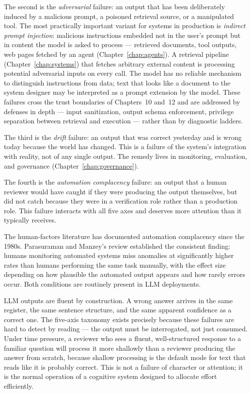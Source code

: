 The second is the \emph{adversarial} failure: an output that has
been deliberately induced by a malicious prompt, a poisoned
retrieval source, or a manipulated tool. The most practically
important variant for systems in production is \emph{indirect
prompt injection}: malicious instructions embedded not in the
user's prompt but in content the model is asked to process ---
retrieved documents, tool outputs, web pages fetched by an agent
(Chapter~\ref{chap:agents}). A retrieval pipeline (Chapter~\ref{chap:systems}) that fetches
arbitrary external content is processing potential adversarial
inputs on every call. The model has no reliable mechanism to
distinguish instructions from data; text that looks like a
document to the system designer may be interpreted as a prompt
extension by the model. These failures cross the trust boundaries
of Chapters~10 and~12 and are addressed by defenses in depth ---
input sanitization, output schema enforcement, privilege
separation between retrieval and execution --- rather than by
diagnostic ladders.

The third is the \emph{drift} failure: an output that was correct
yesterday and is wrong today because the world has changed. This
is a failure of the system's integration with reality, not of any
single output. The remedy lives in monitoring, evaluation, and
governance (Chapter~\ref{chap:governance}).

The fourth is the \emph{automation complacency} failure: an output
that a human reviewer would have caught if they were producing the
output themselves, but did not catch because they were in a
verification role rather than a production role. This failure
interacts with all five axes and deserves more attention than it
typically receives.

The human-factors literature has documented automation complacency
since the 1980s. Parasuraman and Manzey's review
\citep{parasuraman2010complacency} established the consistent
finding: humans monitoring automated systems miss anomalies at
significantly higher rates than humans performing the same task
manually, with the effect size depending on how plausible the
automated output appears and how rarely errors occur. Both
conditions are routinely present in LLM deployments.

LLM outputs are fluent by construction. A wrong answer arrives in
the same register, the same sentence structure, and the same
apparent confidence as a correct one. The five-axis taxonomy
exists precisely because these failures are hard to detect by
reading --- the output must be interrogated, not just consumed.
Under time pressure, a reviewer who sees a fluent, well-structured
response to a familiar question will process it more shallowly
than a reviewer producing the answer from scratch, because shallow
processing is the default mode for text that reads like it is
probably correct. This is not a failure of character or
attention; it is the normal operation of a cognitive system
designed to allocate effort efficiently.

